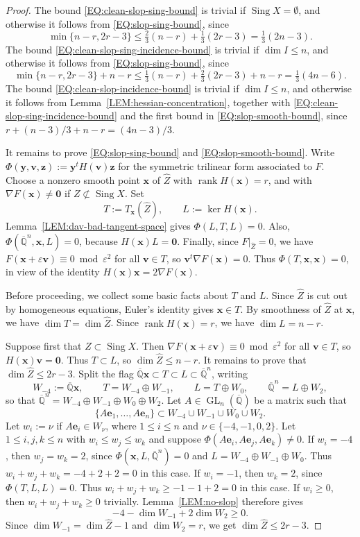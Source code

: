 \documentclass[a4paper,11pt, twoside,reqno]{amsart}
\theoremstyle{plain}
\theoremstyle{definition}
\theoremstyle{remark}
\newcommand{\bfe}{\bm{e}}
\newcommand{\bfv}{\bm{v}}
\newcommand{\bfx}{\bm{x}}
\newcommand{\bfy}{\bm{y}}
\newcommand{\bfz}{\bm{z}}
\DeclareMathOperator{\sing}{Sing}
\DeclareMathOperator{\GL}{GL}
\DeclareMathOperator{\rank}{rank}
\newcommand{\ve}{\varepsilon}
\renewcommand{\le}{\leqslant}
\renewcommand{\ge}{\geqslant}
\newcommand{\Qbar}{\overline{\mathbb{Q}}}
\newcommand{\cone}{\widehat}
\numberwithin{equation}{section}
\begin{document}
\begin{proof}
The bound \eqref{EQ:clean-slop-sing-bound} is trivial if $\sing X = \emptyset$,
and otherwise it follows from \eqref{EQ:slop-sing-bound},
since $$\min\{n-r,2r-3\}
\le \tfrac23(n-r) + \tfrac13(2r-3) = \tfrac13(2n-3).$$
The bound \eqref{EQ:clean-slop-sing-incidence-bound} is trivial if $\dim I \le n$,
and otherwise it follows from \eqref{EQ:slop-sing-bound},
since $$\min\{n-r,2r-3\} + n-r \le \tfrac13(n-r) + \tfrac23(2r-3) + n-r
= \tfrac13(4n-6).$$
The bound \eqref{EQ:clean-slop-incidence-bound} is trivial if $\dim I \le n$,
and otherwise it follows from Lemma~\ref{LEM:hessian-concentration},
together with \eqref{EQ:clean-slop-sing-incidence-bound}
and the first bound in \eqref{EQ:slop-smooth-bound},
since $r+(n-3)/3 + n-r = (4n-3)/3$.

It remains to prove \eqref{EQ:slop-sing-bound} and \eqref{EQ:slop-smooth-bound}.
Write $\Phi(\bfy,\bfv,\bfz) := \bfy^tH(\bfv)\bfz$
for the symmetric trilinear form associated to $F$.
Choose a nonzero smooth point $\bfx$ of $\cone Z$ with $\rank H(\bfx)=r$,
and with $\nabla F(\bfx)\ne \bm0$ if $Z\not\subset\sing X$.
Set
\begin{equation*}
T:=T_{\bfx}(\cone Z),
\qquad L:=\ker H(\bfx).
\end{equation*}
Lemma~\ref{LEM:dav-bad-tangent-space} gives $\Phi(L,T,L)=0$.
Also, $\Phi(\Qbar^n,\bfx,L)=0$, because $H(\bfx)L=\bm0$.
Finally, since $F\vert_{\cone Z}=0$, we have $F(\bfx+\ve\bfv) \equiv 0\bmod{\ve^2}$
for all $\bfv\in T$, so $\bfv^t \nabla F(\bfx) = 0$.
Thus $\Phi(T,\bfx,\bfx)=0$,
in view of the identity $H(\bfx)\bfx=2\nabla F(\bfx)$.

Before proceeding, we collect some basic facts about $T$ and $L$.
Since $\cone Z$ is cut out by homogeneous equations,
Euler's identity gives $\bfx\in T$.
By smoothness of $\cone Z$ at $\bfx$, we have $\dim T = \dim \cone Z$.
Since $\rank H(\bfx)=r$, we have $\dim L = n-r$.

Suppose first that $Z\subset\sing X$.
Then $\nabla F(\bfx+\ve\bfv) \equiv 0\bmod{\ve^2}$
for all $\bfv\in T$,
so $H(\bfx)\bfv = \bm0$.
Thus $T\subset L$, so $\dim \cone Z\le n-r$.
It remains to prove that $\dim \cone Z \le 2r-3$.
Split the flag $\Qbar\bfx \subset T \subset L \subset \Qbar^n$,
writing
\[
W_{-4} := \Qbar\bfx,\qquad
T=W_{-4}\oplus W_{-1},\qquad
L=T\oplus W_0,\qquad
\Qbar^n=L\oplus W_2,
\]
so that $\Qbar^n = W_{-4} \oplus W_{-1} \oplus W_0 \oplus W_2$.
Let $A\in \GL_n(\Qbar)$ be a matrix such that
$$\{A\bfe_1,\dots,A\bfe_n\}
\subset W_{-4} \cup W_{-1} \cup W_0 \cup W_2.$$
Let $w_i := \nu$ if $A\bfe_i\in W_\nu$, where $1\le i\le n$ and $\nu\in \{-4,-1,0,2\}$.
Let $1\le i,j,k\le n$ with $w_i\le w_j\le w_k$
and suppose $\Phi(A\bfe_i,A\bfe_j,A\bfe_k) \ne 0$.
If $w_i=-4$,
then $w_j=w_k=2$, since $\Phi(\bfx,L,\Qbar^n)=0$ and $L = W_{-4} \oplus W_{-1} \oplus W_0$.
Thus $w_i+w_j+w_k = -4+2+2 = 0$ in this case.
If $w_i=-1$, then $w_k=2$, since $\Phi(T,L,L)=0$.
Thus $w_i+w_j+w_k \ge -1-1+2 = 0$ in this case.
If $w_i\ge 0$, then $w_i+w_j+w_k\ge 0$ trivially.
Lemma~\ref{LEM:no-slop} therefore gives
\[
-4-\dim W_{-1}+2\dim W_2 \ge 0.
\]
Since $\dim W_{-1} = \dim \cone Z - 1$ and $\dim W_2 = r$,
we get $\dim \cone Z \le 2r-3$.


\end{proof}
\end{document}
